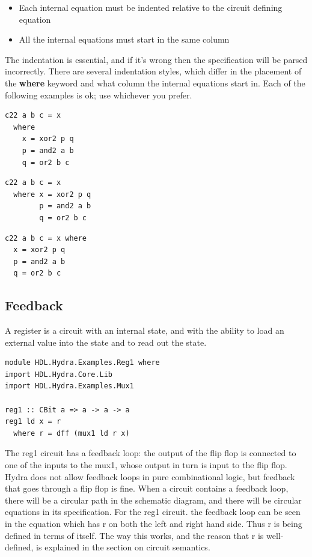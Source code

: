 \documentclass[]{svmono}
\begin{document}
\begin{itemize}
\item Each internal equation must be indented relative to the circuit
defining equation
\item All the internal equations must start in the same column
\end{itemize}

The indentation is essential, and if it's wrong then the specification
will be parsed incorrectly.  There are several indentation styles,
which differ in the placement of the \textbf{where} keyword and what column
the internal equations start in.  Each of the following examples is
ok; use whichever you prefer.

\begin{verbatim}
c22 a b c = x
  where
    x = xor2 p q
    p = and2 a b
    q = or2 b c
\end{verbatim}

\begin{verbatim}
c22 a b c = x
  where x = xor2 p q
        p = and2 a b
        q = or2 b c
\end{verbatim}

\begin{verbatim}
c22 a b c = x where
  x = xor2 p q
  p = and2 a b
  q = or2 b c
\end{verbatim}
\subsection*{Feedback}
\label{sec:org5369bc4}

A register is a circuit with an internal state, and with the ability
to load an external value into the state and to read out the state.



\begin{verbatim}
module HDL.Hydra.Examples.Reg1 where
import HDL.Hydra.Core.Lib
import HDL.Hydra.Examples.Mux1

reg1 :: CBit a => a -> a -> a
reg1 ld x = r
  where r = dff (mux1 ld r x)
\end{verbatim}

The reg1 circuit has a feedback loop: the output of the flip flop is
connected to one of the inputs to the mux1, whose output in turn is
input to the flip flop.  Hydra does not allow feedback loops in pure
combinational logic, but feedback that goes through a flip flop is
fine.  When a circuit contains a feedback loop, there will be a
circular path in the schematic diagram, and there will be circular
equations in its specification.  For the reg1 circuit. the feedback
loop can be seen in the equation which has r on both the left and
right hand side.  Thus r is being defined in terms of itself.  The way
this works, and the reason that r is well-defined, is explained in the
section on circuit semantics.
\end{document}
